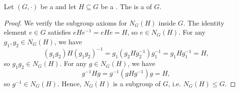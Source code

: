 \begin{lemma} \label{lemma:normalizer_of_subgroup_is_subgroup_of_group}
    Let $(G,\cdot)$ be a  and let $H \subseteq G$ be a . The  is a  of $G$.
\end{lemma}

\begin{proof}
    We verify the subgroup axioms for $N_G(H)$ inside $G$. The identity element $e \in G$ satisfies $e H e^{-1} = e H e = H$, so $e \in N_G(H)$. For any $g_1, g_2 \in N_G(H)$, we have
    $$(g_1 g_2) H (g_1 g_2)^{-1} = g_1 (g_2 H g_2^{-1}) g_1^{-1} = g_1 H g_1^{-1} = H,$$
    so $g_1 g_2 \in N_G(H)$. For any $g \in N_G(H)$, we have
    $$g^{-1} H g = g^{-1} (g H g^{-1}) g = H,$$
    so $g^{-1} \in N_G(H)$. Hence, $N_G(H)$ is a subgroup of $G$, i.e. $N_G(H) \leq G$.
\end{proof}
\endinput